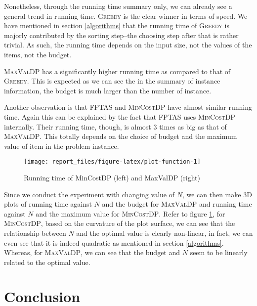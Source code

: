 \documentclass[12pt, oneside]{book}
\begin{document}
Nonetheless, through the running time summary only, we can already see a
general trend in running time. \textsc{Greedy} is the clear winner in
terms of speed. We have mentioned in section \ref{algorithms} that the
running time of \textsc{Greedy} is majorly contributed by the sorting
step--the choosing step after that is rather trivial. As such, the
running time depends on the input size, not the values of the items, not
the budget.

\textsc{MaxValDP} has a significantly higher running time as compared to
that of \textsc{Greedy}. This is expected as we can see the in the
summary of instance information, the budget is much larger than the
number of instance.

Another observation is that \textsc{FPTAS} and \textsc{MinCostDP} have
almost similar running time. Again this can be explained by the fact
that \textsc{FPTAS} uses \textsc{MinCostDP} internally. Their running
time, though, is almost 3 times as big as that of \textsc{MaxValDP}.
This totally depends on the choice of budget and the maximum value of
item in the problem instance.

\begin{figure}

{\centering \texttt{[image: report\_files/figure-latex/plot-function-1]} 

}

\caption{Running time of MinCostDP (left) and MaxValDP (right)}\label{fig:plot-function}
\end{figure}

Since we conduct the experiment with changing value of \(N\), we can
then make 3D plots of running time against \(N\) and the budget for
\textsc{MaxValDP} and running time against \(N\) and the maximum value
for \textsc{MinCostDP}. Refer to figure \ref{fig:plot-function}, for
\textsc{MinCostDP}, based on the curvature of the plot surface, we can
see that the relationship between \(N\) and the optimal value is clearly
non-linear, in fact, we can even see that it is indeed quadratic as
mentioned in section \ref{algorithms}. Whereas, for \textsc{MaxValDP},
we can see that the budget and \(N\) seem to be linearly related to the
optimal value.

\chapter{Conclusion}\label{conclusion}
\end{document}
